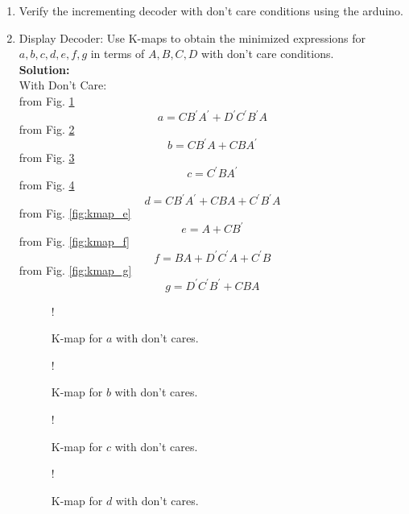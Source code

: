 \documentclass[journal,12pt,twocolumn]{IEEEtran}
\begin{document}
\begin{enumerate}[1.]
\item Verify the incrementing decoder with don't care conditions using the arduino.
\item {Display Decoder:}
Use K-maps to obtain the minimized expressions for $a,b,c,d,e,f,g$ in terms of $A,B,C,D$ with  don't care conditions.\\
\textbf{Solution:}\\
With Don't Care:\\
from Fig. \ref{fig:kmap_a}
\begin{equation}
	a = CB^{\prime}A^{\prime}+D^{\prime}C^{\prime}B^{\prime}A
\end{equation}
from Fig. \ref{fig:kmap_b}
\begin{equation}
	b = CB^{\prime}A+CBA^{\prime}
\end{equation}
from Fig.  \ref{fig:kmap_c}
\begin{equation}
	c = C^{\prime}BA^{\prime}
\end{equation}
from Fig. \ref{fig:kmap_d}
\begin{equation}
	d = CB^{\prime}A^{\prime}+CBA+C^{\prime}B^{\prime}A
\end{equation}
from Fig. \ref{fig:kmap_e}
\begin{equation}
	e = A+CB^{\prime}
\end{equation}
from Fig. \ref{fig:kmap_f}
\begin{equation}
	f = BA+D^{\prime}C^{\prime}A+C^{\prime}B
\end{equation}
from Fig. \ref{fig:kmap_g}
\begin{equation}
	g = D^{\prime}C^{\prime}B^{\prime}+CBA
\end{equation}
\begin{figure}[!h]
	\resizebox {\columnwidth} {!} {
		
	}
	\caption{K-map for $a$ with don't cares.}
	\label{fig:kmap_a}
\end{figure}
\begin{figure}[!h]
	\resizebox {\columnwidth} {!} {
		
	}
	\caption{K-map for $b$ with don't cares.}
	\label{fig:kmap_b}
\end{figure}
\begin{figure}[!h]
	\resizebox {\columnwidth} {!} {
		
	}
	\caption{K-map for $c$ with don't cares.}
	\label{fig:kmap_c}
\end{figure}
\begin{figure}[!h]
	\resizebox {\columnwidth} {!} {
		
	}
	\caption{K-map for $d$ with don't cares.}
	\label{fig:kmap_d}

\end{figure}
\end{enumerate}
\end{document}
